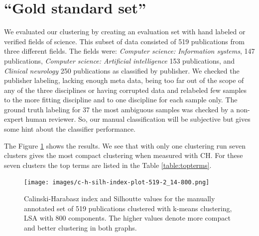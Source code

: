 \section{``Gold standard set''}
We evaluated our clustering by creating an evaluation set with
hand labeled or verified fields of science. This subset of data 
consisted of 519 publications from three different fields. The fields
were: \emph{Computer science: Information systems}, 147 publications,
\emph{Computer science: Artificial intelligence} 153 publications, 
and \emph{Clinical neurology} 250 publications as classified by 
publisher. We checked the publisher labeling,  lacking enough meta data, being too far out of the 
scope of any of the three disciplines or having corrupted data and
relabeled few  samples to the more fitting 
discipline and to one discipline for each sample only. The ground 
truth labeling for 37 the most ambiguous samples was checked by 
a non-expert human reviewer. So, our manual classification will
be subjective but gives some hint about the classifier performance.

The Figure \ref{fig:ch-silh01} shows the results. We see that with 
only one clustering run seven clusters gives the most compact 
clustering when measured with CH.
For these seven clusters the top terms are listed in the Table \ref{table:topterms}.

\begin{figure}[ht]
  \begin{center}    
\texttt{[image: images/c-h-silh-index-plot-519-2\_14-800.png]}
    \caption{Calinski-Harabasz index and Silhoutte values for the
    manually annotated set of 519 publications clustered with k-means 
    clustering, LSA with 800 components. The higher values denote 
    more compact and better clustering in both graphs.}
    \label{fig:ch-silh01}
  \end{center}
\end{figure}

